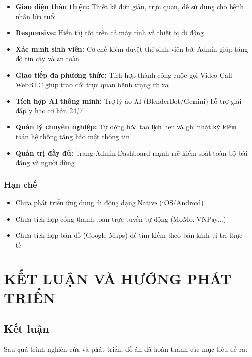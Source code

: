\documentclass[13pt,a4paper]{extreport}
\begin{document}
\begin{itemize}
    \item \textbf{Giao diện thân thiện:} Thiết kế đơn giản, trực quan, dễ sử dụng cho bệnh nhân lớn tuổi
    \item \textbf{Responsive:} Hiển thị tốt trên cả máy tính và thiết bị di động
    \item \textbf{Xác minh sinh viên:} Cơ chế kiểm duyệt thẻ sinh viên bởi Admin giúp tăng độ tin cậy và an toàn
    \item \textbf{Giao tiếp đa phương thức:} Tích hợp thành công cuộc gọi Video Call WebRTC giúp trao đổi trực quan bệnh trạng từ xa
    \item \textbf{Tích hợp AI thông minh:} Trợ lý ảo AI (BlenderBot/Gemini) hỗ trợ giải đáp y học cơ bản 24/7
    \item \textbf{Quản lý chuyên nghiệp:} Tự động hóa tạo lịch hẹn và ghi nhật ký kiểm toán hệ thống tăng bảo mật thông tin
    \item \textbf{Quản trị đầy đủ:} Trang Admin Dashboard mạnh mẽ kiểm soát toàn bộ bài đăng và người dùng
\end{itemize}

\subsection{Hạn chế}

\begin{itemize}
    \item Chưa phát triển ứng dụng di động dạng Native (iOS/Android)
    \item Chưa tích hợp cổng thanh toán trực tuyến tự động (MoMo, VNPay...)
    \item Chưa tích hợp bản đồ (Google Maps) để tìm kiếm theo bán kính vị trí thực tế
\end{itemize}

\newpage

\chapter{KẾT LUẬN VÀ HƯỚNG PHÁT TRIỂN}

\section{Kết luận}

Sau quá trình nghiên cứu và phát triển, đồ án đã hoàn thành các mục tiêu đề ra:
\end{document}
